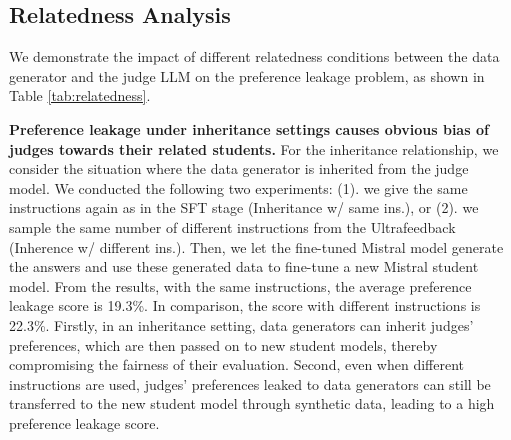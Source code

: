 \documentclass{article} %
\begin{document}
\subsection{Relatedness Analysis}
\label{Results under Different Correlations}



We demonstrate the impact of different relatedness conditions between the data generator and the judge LLM on the preference leakage problem, as shown in Table \ref{tab:relatedness}. 

\textbf{Preference leakage under inheritance settings causes obvious bias of judges towards their related students.} For the inheritance relationship, we consider the situation where the data generator is inherited from the judge model. We conducted the following two experiments: (1). we give the same instructions again as in the SFT stage (Inheritance w/ same ins.), or (2). we sample the same number of different instructions from the Ultrafeedback (Inherence w/ different ins.). Then, we let the fine-tuned Mistral model generate the answers and use these generated data to fine-tune a new Mistral student model. From the results, with the same instructions, the average preference leakage score is 19.3\%. In comparison, the score with different instructions is 22.3\%. Firstly, in an inheritance setting, data generators can inherit judges' preferences, which are then passed on to new student models, thereby compromising the fairness of their evaluation. Second, even when different instructions are used, judges' preferences leaked to data generators can still be transferred to the new student model through synthetic data, leading to a high preference leakage score.
\end{document}
